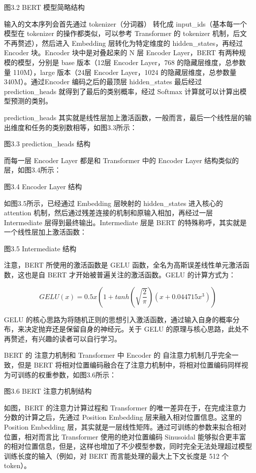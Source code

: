 \documentclass[12pt,a4paper]{book}
\begin{document}
图3.2 BERT 模型简略结构

输入的文本序列会首先通过 tokenizer（分词器） 转化成
input\_ids（基本每一个模型在 tokenizer 的操作都类似，可以参考
Transformer 的 tokenizer 机制，后文不再赘述），然后进入 Embedding
层转化为特定维度的 hidden\_states，再经过 Encoder 块。Encoder
块中是对叠起来的 N 层 Encoder Layer，BERT 有两种规模的模型，分别是 base
版本（12层 Encoder Layer，768 的隐藏层维度，总参数量 110M），large
版本（24层 Encoder Layer，1024 的隐藏层维度，总参数量
340M）。通过Encoder 编码之后的最顶层 hidden\_states 最后经过
prediction\_heads 就得到了最后的类别概率，经过 Softmax
计算就可以计算出模型预测的类别。

prediction\_heads
其实就是线性层加上激活函数，一般而言，最后一个线性层的输出维度和任务的类别数相等，如图3.3所示：

图3.3 prediction\_heads 结构

而每一层 Encoder Layer 都是和 Transformer 中的 Encoder Layer
结构类似的层，如图3.4所示：

图3.4 Encoder Layer 结构

如图3.5所示，已经通过 Embedding 层映射的 hidden\_states 进入核心的
attention 机制，然后通过残差连接的机制和原输入相加，再经过一层
Intermediate 层得到最终输出。Intermediate 层是 BERT
的特殊称呼，其实就是一个线性层加上激活函数：

图3.5 Intermediate 结构

注意，BERT 所使用的激活函数是 GELU
函数，全名为高斯误差线性单元激活函数，这也是自 BERT
才开始被普遍关注的激活函数。GELU 的计算方式为：

\[GELU(x) = 0.5x(1 + tanh(\sqrt{\frac{2}{\pi}})(x + 0.044715x^3))\]

GELU
的核心思路为将随机正则的思想引入激活函数，通过输入自身的概率分布，来决定抛弃还是保留自身的神经元。关于
GELU 的原理与核心思路，此处不再赘述，有兴趣的读者可以自行学习。

BERT 的 注意力机制和 Transformer 中 Encoder 的
自注意力机制几乎完全一致，但是 BERT
将相对位置编码融合在了注意力机制中，将相对位置编码同样视为可训练的权重参数，如图3.6所示：

图3.6 BERT 注意力机制结构

如图，BERT 的注意力计算过程和 Transformer
的唯一差异在于，在完成注意力分数的计算之后，先通过 Position Embedding
层来融入相对位置信息。这里的 Position Embedding
层，其实就是一层线性矩阵。通过可训练的参数来拟合相对位置，相对而言比
Transformer 使用的绝对位置编码 Sinusoidal
能够拟合更丰富的相对位置信息，但是，这样也增加了不少模型参数，同时完全无法处理超过模型训练长度的输入（例如，对
BERT 而言能处理的最大上下文长度是 512 个 token）。
\end{document}
